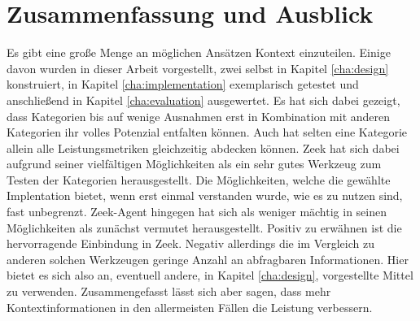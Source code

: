 \chapter{Zusammenfassung und Ausblick}%
\label{cha:conclusion}


Es gibt eine große Menge an möglichen Ansätzen Kontext einzuteilen. Einige davon wurden in dieser Arbeit vorgestellt, zwei selbst in Kapitel \ref{cha:design} konstruiert, in Kapitel \ref{cha:implementation} exemplarisch getestet und anschließend in Kapitel \ref{cha:evaluation} ausgewertet. Es hat sich dabei gezeigt, dass Kategorien bis auf wenige Ausnahmen erst in Kombination mit anderen Kategorien ihr volles Potenzial entfalten können. Auch hat selten eine Kategorie allein alle Leistungsmetriken gleichzeitig abdecken können. Zeek hat sich dabei aufgrund seiner vielfältigen Möglichkeiten als ein sehr gutes Werkzeug zum Testen der Kategorien herausgestellt. Die Möglichkeiten, welche die gewählte Implentation bietet, wenn erst einmal verstanden wurde, wie es zu nutzen sind, fast unbegrenzt. Zeek-Agent hingegen hat sich als weniger mächtig in seinen Möglichkeiten als zunächst vermutet herausgestellt. Positiv zu erwähnen ist die hervorragende Einbindung in Zeek. Negativ allerdings die im Vergleich zu anderen solchen Werkzeugen geringe Anzahl an abfragbaren Informationen. Hier bietet es sich also an, eventuell andere, in Kapitel \ref{cha:design}, vorgestellte Mittel zu verwenden. Zusammengefasst lässt sich aber sagen, dass mehr Kontextinformationen in den allermeisten Fällen die Leistung verbessern.\newline
